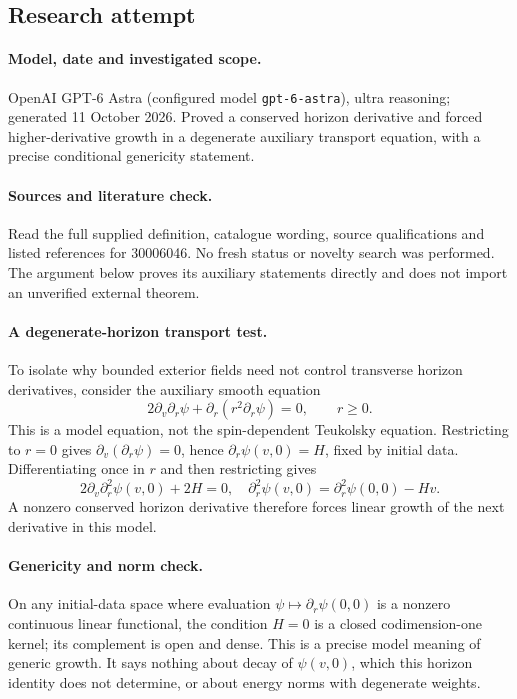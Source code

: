 \documentclass[11pt]{article}
\begin{document}
\subsection{Research attempt}
\paragraph{Model, date and investigated scope.}
OpenAI GPT-6 Astra (configured model \texttt{gpt-6-astra}), ultra reasoning; generated 11 October 2026. Proved a conserved horizon derivative and forced higher-derivative growth in a degenerate auxiliary transport equation, with a precise conditional genericity statement.

\paragraph{Sources and literature check.}
Read the full supplied definition, catalogue wording, source qualifications and listed references for 30006046. No fresh status or novelty search was performed. The argument below proves its auxiliary statements directly and does not import an unverified external theorem.

\paragraph{A degenerate-horizon transport test.} To isolate why bounded exterior fields need not control transverse horizon derivatives, consider the auxiliary smooth equation
\[
 2\partial_v\partial_r\psi+\partial_r(r^2\partial_r\psi)=0,
 \qquad r\geq0.
\]
This is a model equation, not the spin-dependent Teukolsky equation. Restricting to \(r=0\) gives \(\partial_v(\partial_r\psi)=0\), hence \(\partial_r\psi(v,0)=H\), fixed by initial data. Differentiating once in \(r\) and then restricting gives
\[
 2\partial_v\partial_r^2\psi(v,0)+2H=0,
 \quad \partial_r^2\psi(v,0)=\partial_r^2\psi(0,0)-Hv.
\]
A nonzero conserved horizon derivative therefore forces linear growth of the next derivative in this model.
\paragraph{Genericity and norm check.} On any initial-data space where evaluation \(\psi\mapsto\partial_r\psi(0,0)\) is a nonzero continuous linear functional, the condition \(H=0\) is a closed codimension-one kernel; its complement is open and dense. This is a precise model meaning of generic growth. It says nothing about decay of \(\psi(v,0)\), which this horizon identity does not determine, or about energy norms with degenerate weights.
\end{document}
